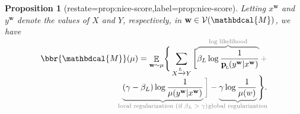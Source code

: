 \documentclass[letterpaper]{article} %
\theoremstyle{plain}
\newtheorem{prop}[theorem]{Proposition}
\theoremstyle{definition}
\theoremstyle{remark}
\DeclareMathOperator*{\E}{\mathbb{E}} %
\newcommand\mat[1]{\mathbf{#1}}
\newcommand{\bp}[1][L]{\mat{p}_{\!_{#1}\!}}
\newcommand{\V}{\mathcal V}
\newcommand{\dg}[1]{\mathbdcal{#1}}
\begin{document}
\begin{prop}[restate=prop:nice-score,label=prop:nice-score]%
 Letting $x^{\mat w}$ and $y^{\mat w}$ denote the values of
  $X$ and $Y$, respectively, in $\mat w \in \V(\dg M)$, 
we have 
\begin{equation}\label{eq:semantics-breakdown}
\begin{split}
    \bbr{\dg M}(\mu) =  \E_{\mat w \sim \mu}\! \Bigg\{
 \sum_{ X \xrightarrow{\!\!L} Y  }
\bigg[\!
    \color{gray}\overbrace{\color{black}
      \beta_L \log \frac{1}{\bp(y^{\mat w} |x^{\mat w})}
	}^{\color{gray}\smash{\text{log likelihood}}} + \\[-0.5em]
    \color{gray}\underbrace{\color{black} 
(\gamma - \beta_L ) \log \frac{1}{\mu(y^{\mat w} |x^{\mat w})} 
	}_{\color{gray}\smash{\mathclap{\text{local regularization (if $\beta_L > \gamma$)}}}}\bigg] - \underbrace{\color{black}
    \gamma \log \frac{1}{\mu(w)}
	}_{\color{gray}\smash{\mathclap{\text{global
        regularization}}}}\color{black} \Bigg\} .
\end{split}
\end{equation}
\end{prop}
\end{document}
